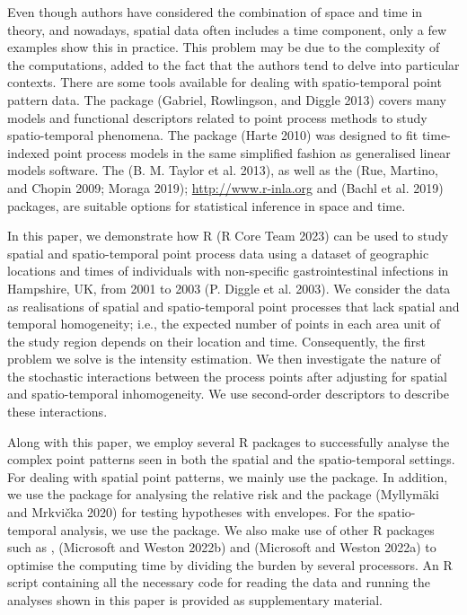 Even though authors have considered the combination of space and time in theory, and nowadays, spatial data often includes a time component, only a few examples show this in practice. This problem may be due to the complexity of the computations, added to the fact that the authors tend to delve into particular contexts. There are some tools available for dealing with spatio-temporal point pattern data. The  package (Gabriel, Rowlingson, and Diggle 2013) covers many models and functional descriptors related to point process methods to study spatio-temporal phenomena. The  package (Harte 2010) was designed to fit time-indexed point process models in the same simplified fashion as generalised linear models software. The  (B. M. Taylor et al. 2013), as well as the  (Rue, Martino, and Chopin 2009; Moraga 2019); \url{http://www.r-inla.org} and  (Bachl et al. 2019) packages, are suitable options for statistical inference in space and time.

In this paper, we demonstrate how R (R Core Team 2023) can be used to study spatial and spatio-temporal point process data using a dataset of geographic locations and times of individuals with non-specific gastrointestinal infections in Hampshire, UK, from 2001 to 2003 (P. Diggle et al. 2003). We consider the data as realisations of spatial and spatio-temporal point processes that lack spatial and temporal homogeneity; i.e., the expected number of points in each area unit of the study region depends on their location and time. Consequently, the first problem we solve is the intensity estimation. We then investigate the nature of the stochastic interactions between the process points after adjusting for spatial and spatio-temporal inhomogeneity. We use second-order descriptors to describe these interactions.

Along with this paper, we employ several R packages to successfully analyse the complex point patterns seen in both the spatial and the spatio-temporal settings. For dealing with spatial point patterns, we mainly use the  package. In addition, we use the  package for analysing the relative risk and the  package (Myllymäki and Mrkvička 2020) for testing hypotheses with envelopes. For the spatio-temporal analysis, we use the  package. We also make use of other R packages such as ,  (Microsoft and Weston 2022b) and  (Microsoft and Weston 2022a) to optimise the computing time by dividing the burden by several processors. An R script containing all the necessary code for reading the data and running the analyses shown in this paper is provided as supplementary material.

